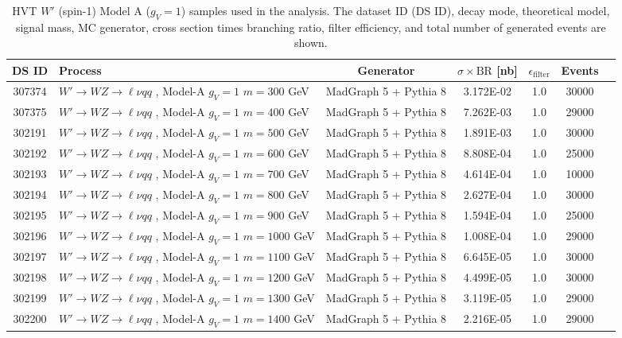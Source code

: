 \begin{landscape}
\begin{table}[!htb]
\caption[HVT $W'$ Monte Carlo samples]{HVT $W'$ (spin-1) Model A ($g_V=1$) samples used in the analysis. The dataset ID (DS ID), decay mode, theoretical model, signal mass, MC generator, cross section times branching ratio, filter efficiency, and total number of generated events are shown.}
\label{tabular:mc_samples_Wprime}
\begin{footnotesize}
\begin{center}
\begin{tabular}{c|l|c|c|c|cr}
	\hline\hline
	DS ID & Process & Generator & $\sigma\times\text{BR}$ [nb] & $\epsilon_{\text{filter}}$ & Events \\ \hline\hline
	307374 & $W' \to WZ \to \ell\nu qq $ , Model-A $g_V=1$ $m=300$  GeV& MadGraph 5 + Pythia 8 & 3.172E-02  & 1.0& 30000 \\ 
	307375 & $W' \to WZ \to \ell\nu qq $ , Model-A $g_V=1$ $m=400$  GeV& MadGraph 5 + Pythia 8 & 7.262E-03 & 1.0& 29000 \\ 
	302191 & $W' \to WZ \to \ell\nu qq $ , Model-A $g_V=1$ $m=500$  GeV& MadGraph 5 + Pythia 8 & 1.891E-03 & 1.0& 30000 \\ 
	302192 & $W' \to WZ \to \ell\nu qq $ , Model-A $g_V=1$ $m=600$  GeV& MadGraph 5 + Pythia 8 & 8.808E-04 & 1.0& 25000 \\ 
	302193 & $W' \to WZ \to \ell\nu qq $ , Model-A $g_V=1$ $m=700$  GeV& MadGraph 5 + Pythia 8 & 4.614E-04 & 1.0& 10000 \\ 
	302194 & $W' \to WZ \to \ell\nu qq $ , Model-A $g_V=1$ $m=800$  GeV& MadGraph 5 + Pythia 8 & 2.627E-04 & 1.0& 30000 \\ 
	302195 & $W' \to WZ \to \ell\nu qq $ , Model-A $g_V=1$ $m=900$  GeV& MadGraph 5 + Pythia 8 & 1.594E-04 & 1.0& 25000 \\ 
	302196 & $W' \to WZ \to \ell\nu qq $ , Model-A $g_V=1$ $m=1000$ GeV& MadGraph 5 + Pythia 8 & 1.008E-04 & 1.0& 29000 \\ 
	302197 & $W' \to WZ \to \ell\nu qq $ , Model-A $g_V=1$ $m=1100$ GeV& MadGraph 5 + Pythia 8 & 6.645E-05 & 1.0& 30000 \\ 
	302198 & $W' \to WZ \to \ell\nu qq $ , Model-A $g_V=1$ $m=1200$ GeV& MadGraph 5 + Pythia 8 & 4.499E-05 & 1.0& 30000 \\ 
	302199 & $W' \to WZ \to \ell\nu qq $ , Model-A $g_V=1$ $m=1300$ GeV& MadGraph 5 + Pythia 8 & 3.119E-05 & 1.0& 29000 \\ 
	302200 & $W' \to WZ \to \ell\nu qq $ , Model-A $g_V=1$ $m=1400$ GeV& MadGraph 5 + Pythia 8 & 2.216E-05 & 1.0& 29000 \\ 

\end{tabular}
\end{center}
\end{footnotesize}
\end{table}
\end{landscape}
